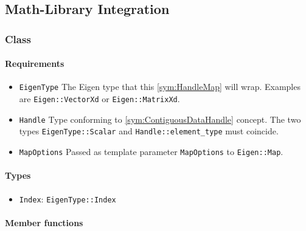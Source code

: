 \subsection{Math-Library Integration}

\subsubsection[Class HandleMap]{Class }

\paragraph{Requirements}

\begin{itemize}
	\item \texttt{EigenType} The Eigen type that this \ref{sym:HandleMap} will wrap. Examples are \texttt{Eigen::VectorXd} or \texttt{Eigen::MatrixXd}.
	\item \texttt{Handle} Type conforming to \ref{sym:ContiguousDataHandle} concept. The two types \texttt{EigenType::Scalar} and \texttt{Handle::element\_type} must coincide.
	\item \texttt{MapOptions} Passed as template parameter \texttt{MapOptions} to \texttt{Eigen::Map}.
\end{itemize}

\paragraph{Types}

\begin{itemize}
	\item \texttt{Index}: \texttt{EigenType::Index}
\end{itemize}

\paragraph{Member functions}

